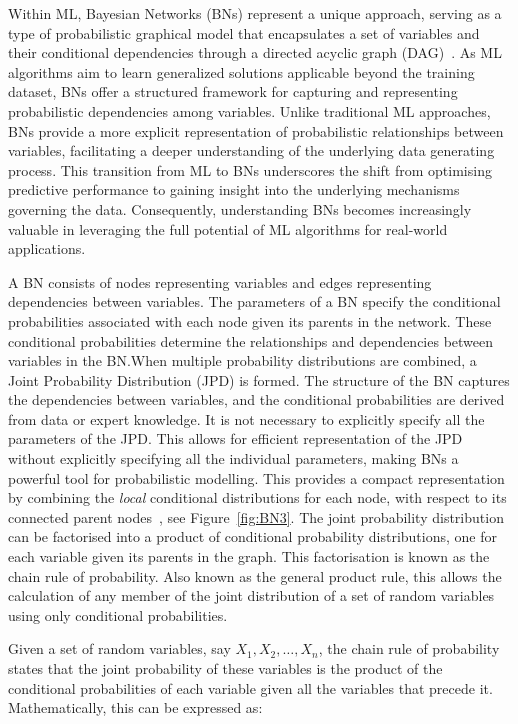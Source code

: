 \documentclass[journal]{IEEEtran}
\begin{document}
Within ML, Bayesian Networks (BNs) represent a unique approach, serving as a type of probabilistic graphical model that encapsulates a set of variables and their conditional dependencies through a directed acyclic graph (DAG)~\cite{Hand2001}. As ML algorithms aim to learn generalized solutions applicable beyond the training dataset, BNs offer a structured framework for capturing and representing probabilistic dependencies among variables. Unlike traditional ML approaches, BNs provide a more explicit representation of probabilistic relationships between variables, facilitating a deeper understanding of the underlying data generating process. This transition from ML to BNs underscores the shift from optimising predictive performance to gaining insight into the underlying mechanisms governing the data. Consequently, understanding BNs becomes increasingly valuable in leveraging the full potential of ML algorithms for real-world applications.

A BN consists of nodes representing variables and edges representing dependencies between variables. The parameters of a BN specify the conditional probabilities associated with each node given its parents in the network. These conditional probabilities determine the relationships and dependencies between variables in the BN.\@ When multiple probability distributions are combined, a Joint Probability Distribution (JPD) is formed.  The structure of the BN captures the dependencies between variables, and the conditional probabilities are derived from data or expert knowledge. It is not necessary to explicitly specify all the parameters of the JPD. This allows for efficient representation of the JPD without explicitly specifying all the individual parameters, making BNs a powerful tool for probabilistic modelling. This provides a compact representation by combining the \textit{local} conditional distributions for each node, with respect to its connected parent nodes~\cite{Koller2009}, see Figure~\ref{fig:BN3}. The joint probability distribution can be factorised into a product of conditional probability distributions, one for each variable given its parents in the graph. This factorisation is known as the chain rule of probability. Also known as the general product rule, this allows the calculation of any member of the joint distribution of a set of random variables using only conditional probabilities.

Given a set of random variables, say $X_1, X_2, \ldots, X_n$, the chain rule of probability states that the joint probability of these variables is the product of the conditional probabilities of each variable given all the variables that precede it. Mathematically, this can be expressed as:
\end{document}
